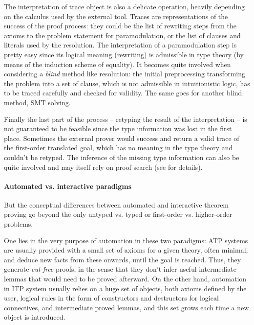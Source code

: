 \documentclass[twoside,a4paper,12pt]{article}
\begin{document}
The interpretation of trace object is also a delicate operation,
heavily depending on the calculus used by the external tool. Traces
are representations of the success of the proof process: they could be
the list of rewriting steps from the axioms to the problem statement
for paramodulation, or the list of clauses and literals used by the
resolution. The interpretation of a paramodulation step is pretty easy
since its logical meaning (rewriting) is admissible in type theory (by
means of the induction scheme of equality). It becomes quite involved
when considering a \emph{blind} method like resolution: the initial
preprocessing transforming the problem into a set of clause, which is
not admissible in intuitionistic logic, has to be traced carefully and
checked for validity. The same goes for another blind method, SMT
solving.

Finally the last part of the process -- retyping the result of the
interpretation -- is not guaranteed to be feasible since the type
information was lost in the first place. Sometimes the external prover
would success and return a valid trace of the first-order translated
goal, which has no meaning in the type theory and couldn't be
retyped. The inference of the missing type information can also be
quite involved and may itself rely on proof search (see
\cite{asperti2010paramodulation} for details).

\paragraph{Automated vs. interactive paradigms}

But the conceptual differences between automated and interactive
theorem proving go beyond the only untyped vs. typed or first-order
vs. higher-order problems. 

One lies in the very purpose of automation in these two paradigms: ATP
systems are usually provided with a small set of axioms for a given
theory, often minimal, and deduce new facts from these onwards, until
the goal is reached. Thus, they generate \emph{cut-free} proofs, in
the sense that they don't infer useful intermediate lemmas that would
need to be proved afterward. On the other hand, automation in ITP
system usually relies on a huge set of objects, both axioms defined by
the user, logical rules in the form of constructors and destructors
for logical connectives, and intermediate proved lemmas, and this set
grows each time a new object is introduced. 
\end{document}
